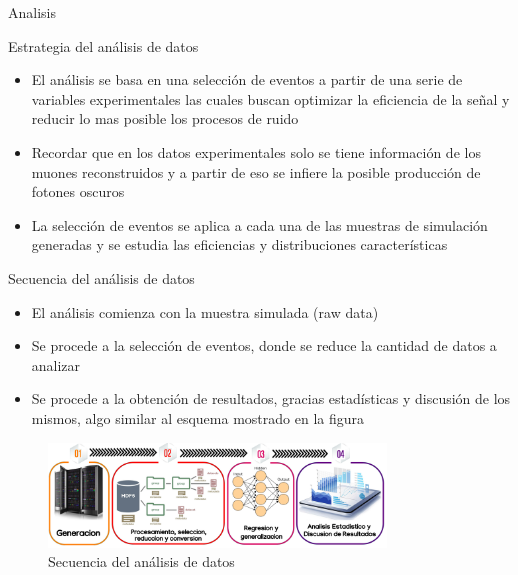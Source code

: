 \begin{frame}{}
    \begin{center}
        \LARGE Analisis
    \end{center}
\end{frame}


\begin{frame}{Estrategia del an\'alisis de datos}

\begin{itemize}
    \item El an\'alisis se basa en una selecci\'on de eventos a partir de una serie de variables experimentales las cuales buscan optimizar la eficiencia de la señal y reducir lo mas posible los procesos de ruido
    \item Recordar que en los datos experimentales solo se tiene informaci\'on de los muones reconstruidos y a partir de eso se infiere la posible producci\'on de fotones oscuros
    \item La selecci\'on de eventos se aplica a cada una de las muestras de simulaci\'on generadas y se estudia las eficiencias y distribuciones características 
\end{itemize}
    
\end{frame}


\begin{frame}{Secuencia del análisis de datos}

\begin{itemize}
    \item El análisis comienza con la muestra simulada (raw data) 
    \item Se procede a la selección de eventos, donde se reduce la cantidad de datos a analizar 
    \item Se procede a la obtención de resultados, gracias estadísticas y discusión de los mismos, algo similar al esquema mostrado en la figura 
\end{itemize}

\begin{figure}[h]
\centering
\includegraphics[width=0.8\textwidth]{Imag/procesos_darksusy.png}
\caption{Secuencia del análisis de datos}
\end{figure}

\end{frame}

